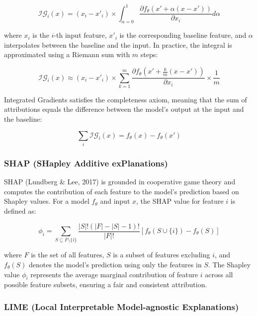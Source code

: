 \begin{equation}
\mathcal{IG}_i(x) = (x_i - x'_i) \times 
\int_{\alpha=0}^{1} \frac{\partial f_\theta
(x' + \alpha(x - x'))}{\partial x_i} d\alpha
\label{eq:ig}
\end{equation}

where $x_i$ is the $i$-th input feature, $x'_i$ 
is the corresponding baseline feature, and 
$\alpha$ interpolates between the baseline and 
the input. In practice, the integral is 
approximated using a Riemann sum with $m$ steps:

\begin{equation}
\mathcal{IG}_i(x) \approx (x_i - x'_i) \times 
\sum_{k=1}^{m} \frac{\partial f_\theta\left(x' + 
\frac{k}{m}(x - x')\right)}{\partial x_i} 
\times \frac{1}{m}
\label{eq:igapprox}
\end{equation}

Integrated Gradients satisfies the completeness 
axiom, meaning that the sum of attributions 
equals the difference between the model's output 
at the input and the baseline:

\begin{equation}
\sum_{i} \mathcal{IG}_i(x) = 
f_\theta(x) - f_\theta(x')
\label{eq:igcompleteness}
\end{equation}

\subsubsection{SHAP (SHapley Additive 
exPlanations)}

SHAP (Lundberg \& Lee, 2017) is grounded in 
cooperative game theory and computes the 
contribution of each feature to the model's 
prediction based on Shapley values. For a 
model $f_\theta$ and input $x$, the SHAP 
value for feature $i$ is defined as:

\begin{equation}
\phi_i = \sum_{S \subseteq F \setminus \{i\}} 
\frac{|S|!(|F|-|S|-1)!}{|F|!} 
\left[f_\theta(S \cup \{i\}) - f_\theta(S)\right]
\label{eq:shap}
\end{equation}

where $F$ is the set of all features, $S$ is a 
subset of features excluding $i$, and 
$f_\theta(S)$ denotes the model's prediction 
using only the features in $S$. The Shapley 
value $\phi_i$ represents the average marginal 
contribution of feature $i$ across all possible 
feature subsets, ensuring a fair and consistent 
attribution.

\subsubsection{LIME (Local Interpretable 
Model-agnostic Explanations)}

